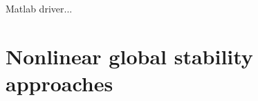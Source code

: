 \documentclass[twocolumn,10pt]{asme2ej}
\begin{document}
 








Matlab driver...








\clearpage

\section{Nonlinear global stability approaches}
\vspace{.2cm}
\end{document}
